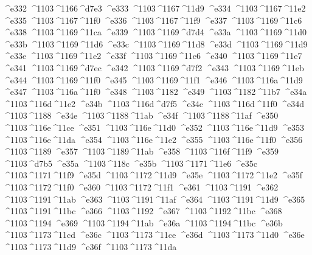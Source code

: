 \checkit ^^^^e332 ^^^^1103^^^^1166^^^^d7e3
\checkit ^^^^e333 ^^^^1103^^^^1167^^^^11d9
\checkit ^^^^e334 ^^^^1103^^^^1167^^^^11e2
\checkit ^^^^e335 ^^^^1103^^^^1167^^^^11f0
\checkit ^^^^e336 ^^^^1103^^^^1167^^^^11f9
\checkit ^^^^e337 ^^^^1103^^^^1169^^^^11c6
\checkit ^^^^e338 ^^^^1103^^^^1169^^^^11ca
\checkit ^^^^e339 ^^^^1103^^^^1169^^^^d7d4
\checkit ^^^^e33a ^^^^1103^^^^1169^^^^11d0
\checkit ^^^^e33b ^^^^1103^^^^1169^^^^11d6
\checkit ^^^^e33c ^^^^1103^^^^1169^^^^11d8
\checkit ^^^^e33d ^^^^1103^^^^1169^^^^11d9
\checkit ^^^^e33e ^^^^1103^^^^1169^^^^11e2
\checkit ^^^^e33f ^^^^1103^^^^1169^^^^11e6
\checkit ^^^^e340 ^^^^1103^^^^1169^^^^11e7
\checkit ^^^^e341 ^^^^1103^^^^1169^^^^d7ec
\checkit ^^^^e342 ^^^^1103^^^^1169^^^^d7f2
\checkit ^^^^e343 ^^^^1103^^^^1169^^^^11eb
\checkit ^^^^e344 ^^^^1103^^^^1169^^^^11f0
\checkit ^^^^e345 ^^^^1103^^^^1169^^^^11f1
\checkit ^^^^e346 ^^^^1103^^^^116a^^^^11d9
\checkit ^^^^e347 ^^^^1103^^^^116a^^^^11f0
\checkit ^^^^e348 ^^^^1103^^^^1182
\checkit ^^^^e349 ^^^^1103^^^^1182^^^^11b7
\checkit ^^^^e34a ^^^^1103^^^^116d^^^^11e2
\checkit ^^^^e34b ^^^^1103^^^^116d^^^^d7f5
\checkit ^^^^e34c ^^^^1103^^^^116d^^^^11f0
\checkit ^^^^e34d ^^^^1103^^^^1188
\checkit ^^^^e34e ^^^^1103^^^^1188^^^^11ab
\checkit ^^^^e34f ^^^^1103^^^^1188^^^^11af
\checkit ^^^^e350 ^^^^1103^^^^116e^^^^11ce
\checkit ^^^^e351 ^^^^1103^^^^116e^^^^11d0
\checkit ^^^^e352 ^^^^1103^^^^116e^^^^11d9
\checkit ^^^^e353 ^^^^1103^^^^116e^^^^11da
\checkit ^^^^e354 ^^^^1103^^^^116e^^^^11e2
\checkit ^^^^e355 ^^^^1103^^^^116e^^^^11f0
\checkit ^^^^e356 ^^^^1103^^^^1189
\checkit ^^^^e357 ^^^^1103^^^^1189^^^^11ab
\checkit ^^^^e358 ^^^^1103^^^^116f^^^^11f9
\checkit ^^^^e359 ^^^^1103^^^^d7b5
\checkit ^^^^e35a ^^^^1103^^^^118c
\checkit ^^^^e35b ^^^^1103^^^^1171^^^^11e6
\checkit ^^^^e35c ^^^^1103^^^^1171^^^^11f9
\checkit ^^^^e35d ^^^^1103^^^^1172^^^^11d9
\checkit ^^^^e35e ^^^^1103^^^^1172^^^^11e2
\checkit ^^^^e35f ^^^^1103^^^^1172^^^^11f0
\checkit ^^^^e360 ^^^^1103^^^^1172^^^^11f1
\checkit ^^^^e361 ^^^^1103^^^^1191
\checkit ^^^^e362 ^^^^1103^^^^1191^^^^11ab
\checkit ^^^^e363 ^^^^1103^^^^1191^^^^11af
\checkit ^^^^e364 ^^^^1103^^^^1191^^^^11d9
\checkit ^^^^e365 ^^^^1103^^^^1191^^^^11bc
\checkit ^^^^e366 ^^^^1103^^^^1192
\checkit ^^^^e367 ^^^^1103^^^^1192^^^^11bc
\checkit ^^^^e368 ^^^^1103^^^^1194
\checkit ^^^^e369 ^^^^1103^^^^1194^^^^11ab
\checkit ^^^^e36a ^^^^1103^^^^1194^^^^11bc
\checkit ^^^^e36b ^^^^1103^^^^1173^^^^11cd
\checkit ^^^^e36c ^^^^1103^^^^1173^^^^11ce
\checkit ^^^^e36d ^^^^1103^^^^1173^^^^11d0
\checkit ^^^^e36e ^^^^1103^^^^1173^^^^11d9
\checkit ^^^^e36f ^^^^1103^^^^1173^^^^11da
